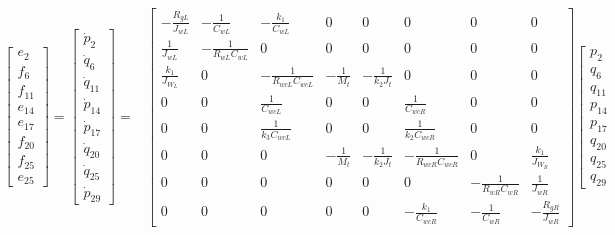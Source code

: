 \begin{equation}\label{2_matrix1}
\begin{aligned}
\left[ 
\begin{array}
{l}{e_{2}} \\ {f_{6}} \\ {f_{11}} \\ {e_{14}} \\ {e_{17}} \\ {f_{20}} \\ {f_{25}} \\ {e_{25}}
\end{array}
\right] 
=
\left[ 
\begin{array}
{c}{\dot{p}_{2}} \\ {\dot{q}_{6}} \\ {\dot{q}_{11}} \\ {\dot{p}_{14}} \\ {\dot{p}_{17}} \\ {\dot{q}_{20}} \\ {\dot{q}_{25}} \\ {\dot{p}_{29}}
\end{array}
\right]
=
&
\left[ 
\begin{array}{cccccccc}
{- \frac{R_{gL}}{J_{w L}}} & - \frac{1}{C_{wL}} & - \frac{k_1}{C_{w L}} & 0 & 0 & 0 & 0 & 0 \\ 
\frac{1}{J_{w L}} & - \frac{1}{R_{wL} C_{wL}} & 0 & 0 & 0 & 0 & 0 & 0 \\ 
\frac{k_{1}}{J_{W_L}}  & 0 & - \frac{1}{R_{wc L} C_{wc L}} & - \frac{1}{M_{t}} & - \frac{1}{k_{2} J_{t}} & 0 & 0 & 0  \\ 
0 & 0 & \frac{1}{C_{wc L}} & 0 & 0 & \frac{1}{C_{wc R}}  & 0 & 0   \\ 
0 & 0 & \frac{1}{k_{3} C_{wc L}} & 0 & 0 & \frac{1}{k_{2} C_{wc R}}  & 0 & 0  \\ 
0 & 0 & 0 & - \frac{1}{M_{t}} & - \frac{1}{k_{2} J_{t}} & - \frac{1}{R_{wc R} C_{wc R}} & 0 & \frac{k_{1}}{J_{W_R}} \\ 
0 & 0 & 0 & 0 & 0 & 0 & - \frac{1}{R_{w R}  C_{w R}} & \frac{1}{J_{w R}}  \\ 
0 & 0 & 0 & 0 & 0 & - \frac{k_{1}}{C_{wc R}} & - \frac{1}{C_{w R}} &  - \frac{R_{g R}}{J_{wR}} 
\end{array}
\right]
\left[
\begin{array}{c}
{p_{2}} \\ {q_{6}} \\ {q_{11}} \\ {p_{14}} \\ {p_{17}} \\ {q_{20}} \\ {q_{25}} \\ {q_{29}}

\end{array}
\end{aligned}
\end{equation}
